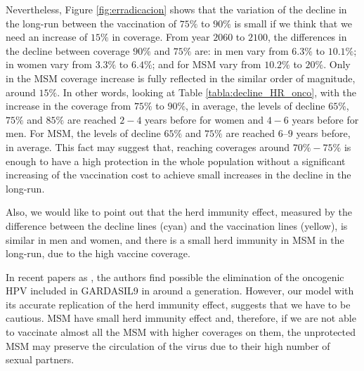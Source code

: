 Nevertheless, Figure \ref{fig:erradicacion} shows that the variation of the decline in the long-run between the vaccination of $75\%$ to $90\%$ is small if we think that we need an increase of $15\%$ in coverage. From year $2060$ to $2100$, the differences in the decline between coverage $90\%$ and $75\%$ are: in men vary from $6.3\%$ to $10.1\%$; in women vary from $3.3\%$ to $6.4\%$; and for MSM vary from $10.2\%$ to $20\%$. Only in the MSM coverage increase is fully reflected in the similar order of magnitude, around $15\%$. In other words, looking at Table \ref{tabla:decline_HR_onco}, with the increase in the coverage from $75\%$ to $90\%$, in average, the levels of decline $65\%$, $75\%$ and $85\%$ are reached $2 - 4$ years before for women and $4 - 6$ years before for men. For MSM, the levels of decline $65\%$ and $75\%$ are reached $6 – 9$ years before, in average. This fact may suggest that, reaching coverages around $70\% - 75\%$ is enough to have a high protection in the whole population without a significant increasing of the vaccination cost to achieve small increases in the decline in the long-run.

Also, we would like to point out that the herd immunity effect, measured by the difference between the decline lines (cyan) and the vaccination lines (yellow), is similar in men and women, and there is a small herd immunity in MSM in the long-run, due to the high vaccine coverage.

In recent papers as \cite{Brisson2016, SIMMS2019394, BRISSON2019319}, the authors find possible the elimination of the oncogenic HPV included in GARDASIL9 in around a generation. However, our model with its accurate replication of the herd immunity effect, suggests that we have to be cautious. MSM have small herd immunity effect and, therefore, if we are not able to vaccinate almost all the MSM with higher coverages on them, the unprotected MSM may preserve the circulation of the virus due to their high number of sexual partners. 

  